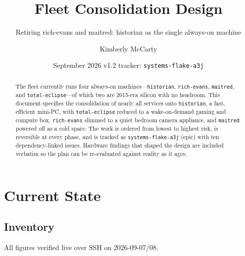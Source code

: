 \documentclass[11pt,letterpaper,headings=small]{scrartcl}
\title{Fleet Consolidation Design}
\subtitle{Retiring rich-evans and maitred: historian as the single always-on machine}
\author{Kimberly McCarty}
\date{September 2026 \textbullet{} v1.2 \textbullet{} tracker: \texttt{systems-flake-a3j}}
\begin{document}
\maketitle

\begin{abstract}
\noindent
The fleet currently runs four always-on machines---\texttt{historian},
\texttt{rich-evans}, \texttt{maitred}, and \texttt{total-eclipse}---of which
two are 2015-era silicon with no headroom. This document specifies the
consolidation of nearly all services onto \texttt{historian}, a fast,
efficient mini-PC, with \texttt{total-eclipse} reduced to a wake-on-demand
gaming and compute box, \texttt{rich-evans} slimmed to a quiet bedroom
camera appliance, and \texttt{maitred} powered off as a cold spare. The
work is ordered from lowest to highest risk, is reversible at every phase,
and is tracked as \texttt{systems-flake-a3j} (epic) with ten
dependency-linked issues. Hardware findings that shaped the design are
included verbatim so the plan can be re-evaluated against reality as it
ages.
\end{abstract}

\section{Current State}

\subsection{Inventory}

All figures verified live over SSH on 2026-09-07/08.
\end{document}
